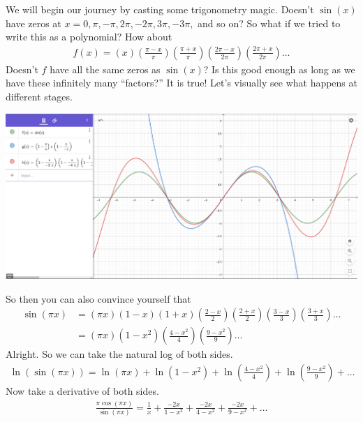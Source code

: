 \documentclass{ximera}
\begin{document}
\begin{exercise}	
	We will begin our journey by casting some trigonometry magic. Doesn't $\sin(x)$ have zeros at $x=0,\pi,-\pi,2\pi,-2\pi,3\pi,-3\pi,$ and so on? So what if we tried to write this as a polynomial? How about
	\begin{align*}
		f(x)= \left( x \right) \left( \frac{\pi-x}{\pi} \right) \left( \frac{\pi+x}{\pi} \right) \left(\frac{2\pi- x}{2\pi} \right) \left( \frac{2\pi+x}{2\pi} \right) \ldots
	\end{align*}
	Doesn't $f$ have all the same zeros as $\sin(x)$? Is this good enough as long as we have these infinitely many ``factors?'' It is true! Let's visually see what happens at different stages.
	\begin{image}
		\includegraphics{sin.png}
	\end{image}
	So then you can also convince yourself that
	\begin{align*}
		\sin(\pi x) &= \left( \pi x \right) \left( 1-x \right) \left(1+x \right) \left(\frac{2-x}{2} \right) \left(\frac{2+x}{2} \right) \left( \frac{3-x}{3} \right) \left( \frac{3+x}{3} \right) \ldots \\
		&= \left( \pi x \right) \left( 1-x^2 \right) \left(\frac{4-x^2}{4} \right) \left(\frac{9-x^2}{9} \right) \ldots
	\end{align*}
	Alright. So we can take the natural log of both sides.
	\begin{align*}
		\ln(\sin(\pi x)) = \ln \left( \pi x \right)+\ln \left( 1-x^2  \right) +\ln \left(\frac{4-x^2}{4} \right) +\ln \left(\frac{9-x^2}{9} \right)+ \ldots
	\end{align*}
	Now take a derivative of both sides.
	\begin{align*}
		\frac{\pi \cos(\pi x)}{\sin(\pi x)} = \frac{1}{x}+\frac{-2x}{1-x^2}+\frac{-2x}{4-x^2}+\frac{-2x}{9-x^2}+\ldots \\	
	\end{align*}

\end{exercise}
\end{document}
